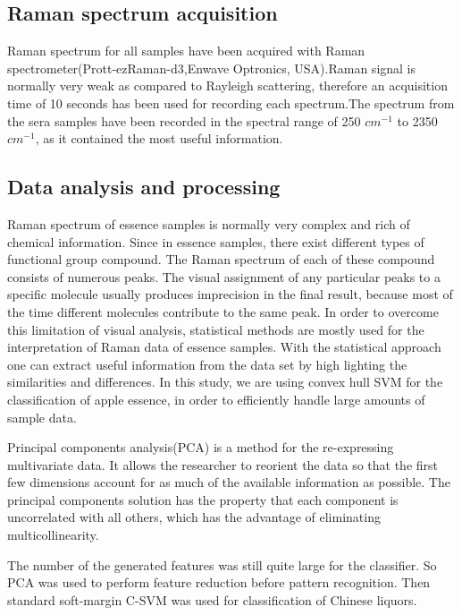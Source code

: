 \documentclass[a4paper]{article}
\begin{document}
\subsection{Raman spectrum acquisition}%
Raman spectrum for all samples have been acquired with Raman spectrometer(Prott-ezRaman-d3,Enwave Optronics, USA).Raman  signal  is  normally  very  weak  as  compared  to  Rayleigh  scattering,  therefore  an acquisition time of 10 seconds has been used for recording each spectrum.The spectrum from the  sera  samples  have  been  recorded  in  the  spectral  range  of  250 $cm^{−1}$  to  2350 $cm^{−1}$,  as  it contained the most useful information.

\subsection{Data analysis and processing}%
Raman  spectrum  of  essence samples  is  normally  very  complex  and  rich  of  chemical information.  Since  in essence  samples,  there  exist  different  types  of  functional group compound. The Raman spectrum of each of these compound consists of  numerous peaks.  The  visual  assignment  of  any  particular  peaks  to  a  specific  molecule usually  produces  imprecision  in  the  final  result,  because  most  of  the  time  different molecules  contribute  to  the  same  peak.  In  order  to  overcome  this  limitation  of  visual analysis, statistical methods are mostly used for the interpretation of Raman data of essence samples. With the statistical approach one can extract useful information from the data set by high  lighting  the  similarities  and differences.  In  this  study,  we  are using convex hull SVM  for  the  classification of  apple essence,  in order to efficiently handle large amounts of sample data.

Principal components analysis(PCA)  is  a  method  for  the  re-expressing  multivariate  data.   It  allows  the researcher to reorient the data so that the first few dimensions account for as much  of  the  available  information  as  possible.  The  principal  components solution has the property that each component is uncorrelated with all others, which  has  the  advantage  of  eliminating  multicollinearity.

The number of the generated features was still quite large for  the  classifier.  So  PCA  was  used  to  perform  feature reduction  before  pattern  recognition.  Then  standard soft-margin  C-SVM  was  used  for  classification  of  Chinese liquors.
\end{document}
